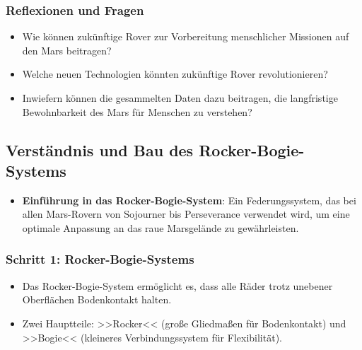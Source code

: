 \documentclass{vorlage-design-main}
\begin{document}
\hypertarget{reflexionen-und-fragen}{%
\subsubsection{Reflexionen und Fragen}\label{reflexionen-und-fragen}}

\begin{itemize}

\item
  Wie können zukünftige Rover zur Vorbereitung menschlicher Missionen
  auf den Mars beitragen?
\item
  Welche neuen Technologien könnten zukünftige Rover revolutionieren?
\item
  Inwiefern können die gesammelten Daten dazu beitragen, die
  langfristige Bewohnbarkeit des Mars für Menschen zu verstehen?
\end{itemize}

\hypertarget{verstuxe4ndnis-und-bau-des-rocker-bogie-systems}{%
\subsection{Verständnis und Bau des
Rocker-Bogie-Systems}\label{verstaendnis-und-bau-des-rocker-bogie-systems}}

\begin{itemize}

\item
  \textbf{Einführung in das Rocker-Bogie-System}: Ein Federungssystem,
  das bei allen Mars-Rovern von Sojourner bis Perseverance verwendet
  wird, um eine optimale Anpassung an das raue Marsgelände zu
  gewährleisten.
\end{itemize}

\hypertarget{schritt-1-rocker-bogie-systems}{%
\subsubsection{Schritt 1:
Rocker-Bogie-Systems}\label{schritt-1-rocker-bogie-systems}}

\begin{itemize}

\item
  Das Rocker-Bogie-System ermöglicht es, dass alle Räder trotz unebener
  Oberflächen Bodenkontakt halten.
\item
  Zwei Hauptteile: >>Rocker<< (große Gliedmaßen für Bodenkontakt) und
  >>Bogie<< (kleineres Verbindungssystem für Flexibilität).
\end{itemize}
\end{document}
